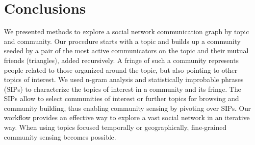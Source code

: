\section{Conclusions}

We presented methods to explore a social network communication graph by topic and community.  Our procedure starts with a topic and builds up a community seeded by a pair of the most active communicators on the topic and their mutual friends (triangles), added recursively.  A fringe of such a community represents people related to those organized around the topic, but also pointing to other topics of interest.  We used n-gram analysis and statistically improbable phrases (SIPs) to characterize the topics of interest in a community and its fringe.  The SIPs allow to select communities of interest or further topics for browsing and community building, thus enabling community sensing by pivoting over SIPs.  Our workflow provides an effective way to explore a vast social network in an iterative way.	 When using topics focused temporally or geographically, fine-grained community sensing becomes possible.

